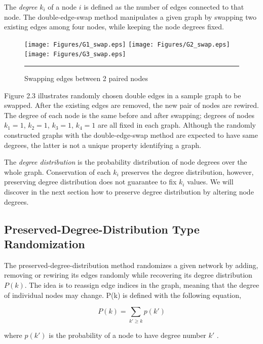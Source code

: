 The \textit{degree} $k_i$ of a node $i$ is defined as the number of edges connected to that node. The double-edge-swap method manipulates a given graph by swapping two existing edges among four nodes, while keeping the node degrees fixed. 


\begin{figure}[htbp]
  \centering
	\texttt{[image: Figures/G1\_swap.eps]}  
    \texttt{[image: Figures/G2\_swap.eps]}  
	\texttt{[image: Figures/G3\_swap.eps]} 
    \rule{35em}{0.5pt}
  \caption[Double-Edge-Swap Example]{Swapping edges between 2 paired nodes}
  \label{fig:Double-Edge-Swap Example}
\end{figure}

Figure 2.3 illustrates randomly chosen double edges in a sample graph to be swapped. After the existing edges are removed, the new pair of nodes are rewired. The degree of each node is the same before and after swapping; degrees of nodes $k_1 = 1$, $k_2=1$, $k_3=1$, $k_4=1$ are all fixed in each graph. Although the randomly constructed graphs with the double-edge-swap method are expected to have same degrees, the latter is not a unique property identifying a graph.

The \textit{degree distribution} is the probability distribution of node degrees over the whole graph. Conservation of each $k_i$ preserves the degree distribution, however, preserving degree distribution does not guarantee to fix $k_i$ values. We will discover in the next section how to preserve degree distribution by altering node degrees.

\subsection{Preserved-Degree-Distribution Type Randomization}

The preserved-degree-distribution method randomizes a given network by adding, removing or rewiring its edges randomly while recovering its degree distribution $P(k)$. The idea is to reassign edge indices in the graph, meaning that the degree of individual nodes may change. P(k) is defined with the following equation,

\begin{equation}
P(k) = \sum_{k' \geq k} p(k')
\end{equation}

where $p(k')$ is the probability of a node to have degree number $k'$ \citep{BAR99a}.



